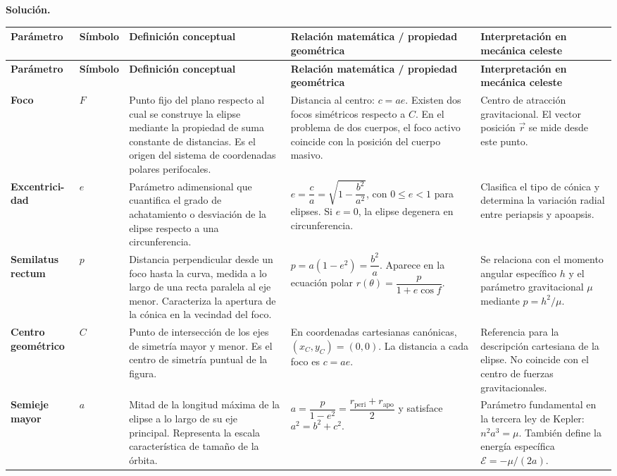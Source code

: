 \documentclass[11pt]{article}
\theoremstyle{prismstyle}
\newenvironment{solution}[1][Solución]
  {\par\textbf{#1.}\ }
  {\par}
\begin{document}
\begin{solution}
\setlength{\LTleft}{0pt}
\setlength{\LTright}{0pt}
\setlength{\tabcolsep}{3pt}
\renewcommand{\arraystretch}{1.18}
{\footnotesize
\begin{longtable}{@{}L{0.11\textwidth}L{0.08\textwidth}L{0.23\textwidth}L{0.24\textwidth}L{0.22\textwidth}@{}}
\toprule
\textbf{Parámetro} & \textbf{Símbolo} & \textbf{Definición conceptual} & \textbf{Relación matemática / propiedad geométrica} & \textbf{Interpretación en mecánica celeste} \\
\midrule
\endfirsthead
\toprule
\textbf{Parámetro} & \textbf{Símbolo} & \textbf{Definición conceptual} & \textbf{Relación matemática / propiedad geométrica} & \textbf{Interpretación en mecánica celeste} \\
\midrule
\endhead
\bottomrule
\endfoot
\textbf{Foco} & $F$ & Punto fijo del plano respecto al cual se construye la elipse mediante la propiedad de suma constante de distancias. Es el origen del sistema de coordenadas polares perifocales. & Distancia al centro: $c = ae$. Existen dos focos simétricos respecto a $C$. En el problema de dos cuerpos, el foco activo coincide con la posición del cuerpo masivo. & Centro de atracción gravitacional. El vector posición $\vec{r}$ se mide desde este punto. \\
\textbf{Excentrici-}\textbf{dad} & $e$ & Parámetro adimensional que cuantifica el grado de achatamiento o desviación de la elipse respecto a una circunferencia. & $e = \dfrac{c}{a} = \sqrt{1-\dfrac{b^2}{a^2}}$, con $0 \le e < 1$ para elipses. Si $e=0$, la elipse degenera en circunferencia. & Clasifica el tipo de cónica y determina la variación radial entre periapsis y apoapsis. \\
\textbf{Semilatus rectum} & $p$ & Distancia perpendicular desde un foco hasta la curva, medida a lo largo de una recta paralela al eje menor. Caracteriza la apertura de la cónica en la vecindad del foco. & $p = a(1-e^2) = \dfrac{b^2}{a}$. Aparece en la ecuación polar $r(\theta) = \dfrac{p}{1+e\cos f}$. & Se relaciona con el momento angular específico $h$ y el parámetro gravitacional $\mu$ mediante $p = h^2/\mu$. \\
\textbf{Centro geométrico} & $C$ & Punto de intersección de los ejes de simetría mayor y menor. Es el centro de simetría puntual de la figura. & En coordenadas cartesianas canónicas, $(x_C,y_C)=(0,0)$. La distancia a cada foco es $c = ae$. & Referencia para la descripción cartesiana de la elipse. No coincide con el centro de fuerzas gravitacionales. \\
\textbf{Semieje mayor} & $a$ & Mitad de la longitud máxima de la elipse a lo largo de su eje principal. Representa la escala característica de tamaño de la órbita. & $a = \dfrac{p}{1-e^2} = \dfrac{r_{\text{peri}} + r_{\text{apo}}}{2}$ y satisface $a^2 = b^2 + c^2$. & Parámetro fundamental en la tercera ley de Kepler: $n^2 a^3 = \mu$. También define la energía específica $\mathcal{E} = -\mu/(2a)$. \\

\end{longtable}}
\end{solution}
\end{document}

